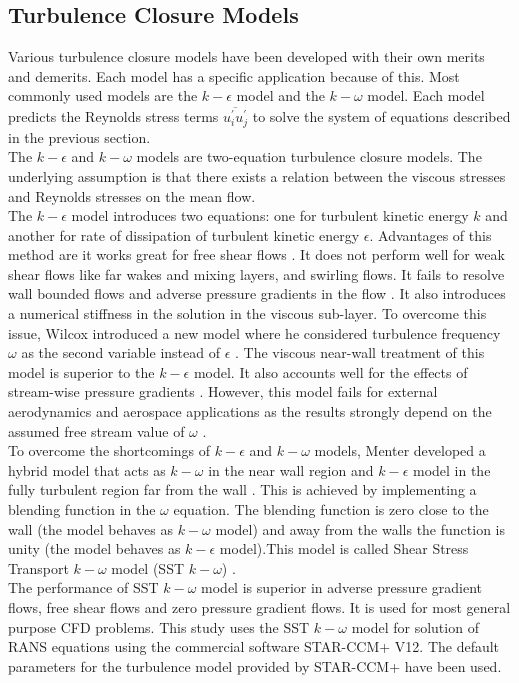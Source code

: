 \subsection{Turbulence Closure Models}
Various turbulence closure models have been developed with their own merits and demerits. Each model has a specific application because of this. Most commonly used models are the $k-\epsilon$ model and the $k-\omega$ model. Each model predicts the Reynolds stress terms $\overline{u_i^\prime u_j^\prime}$ to solve the system of equations described in the previous section.\\
The $k-\epsilon$ and $k-\omega$ models are two-equation turbulence closure models. The underlying assumption is that there exists a relation between the viscous stresses and Reynolds stresses on the mean flow.\\ 
The $k-\epsilon$ model introduces two equations: one for turbulent kinetic energy $k$ and another for rate of dissipation of turbulent kinetic energy $\epsilon$. Advantages of this method are it works great for free shear flows \cite{Reference8}. It does not perform well for weak shear flows like far wakes and mixing layers, and swirling flows. It fails to resolve wall bounded flows and adverse pressure gradients in the flow \cite{Reference8}. It also introduces a numerical stiffness in the solution in the viscous sub-layer. To overcome this issue, Wilcox introduced a new model where he considered turbulence frequency $\omega$ as the second variable instead of $\epsilon$ \cite{Reference8}. The viscous near-wall treatment of this model is superior to the $k-\epsilon$ model. It also accounts well for the effects of stream-wise pressure gradients \cite{Reference9}. However, this model fails for external aerodynamics and aerospace applications as the results strongly depend on the assumed free stream value of $\omega$ \cite{Reference8}.\\
To overcome the  shortcomings of $k-\epsilon$ and $k-\omega$ models, Menter developed a hybrid model that acts as $k-\omega$ in the near wall region and $k-\epsilon$ model in the fully turbulent region far from the wall \cite{Reference8}. This is achieved by implementing a blending function in the $\omega$ equation. The blending function is zero close to the wall (the model behaves as $k-\omega$ model) and away from the walls the function is unity (the model behaves as $k-\epsilon$ model).This model is called Shear Stress Transport $k-\omega$ model (SST $k-\omega$) \cite{Reference9}.\\
The performance of SST $k-\omega$ model is superior in adverse pressure gradient flows, free shear flows and zero pressure gradient flows. It is used for most general purpose CFD problems. This study uses the SST $k-\omega$ model for solution of RANS equations using the commercial software STAR-CCM+ V12. The default parameters for the turbulence model provided by STAR-CCM+ have been used.
